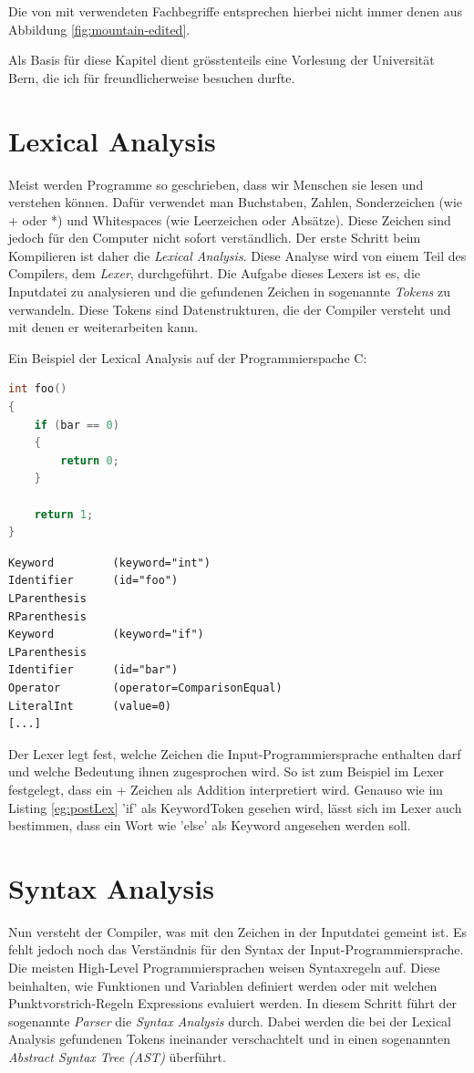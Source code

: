 Die von mit verwendeten Fachbegriffe entsprechen hierbei nicht immer denen aus Abbildung \ref{fig:mountain-edited}.

Als Basis für diese Kapitel dient grösstenteils eine Vorlesung der Universität Bern, die ich für freundlicherweise besuchen durfte.

\section{Lexical Analysis}
Meist werden Programme so geschrieben, dass wir Menschen sie lesen und verstehen können. Dafür verwendet man Buchstaben, Zahlen, Sonderzeichen (wie + oder *) und Whitespaces (wie Leerzeichen oder Absätze).
Diese Zeichen sind jedoch für den Computer nicht sofort verständlich. Der erste Schritt beim Kompilieren ist daher die \textit{Lexical Analysis}. Diese Analyse wird von einem Teil des Compilers, dem \textit{Lexer}, durchgeführt.
Die Aufgabe dieses Lexers ist es, die Inputdatei zu analysieren und die gefundenen Zeichen in sogenannte \textit{Tokens} zu verwandeln. Diese Tokens sind Datenstrukturen, die der Compiler versteht und mit denen er weiterarbeiten kann.

Ein Beispiel der Lexical Analysis auf der Programmierspache C:

\begin{lstlisting}[language=C, label=eg:preLex, caption=C code vor Lexical Analysis]
int foo()
{
    if (bar == 0)
    {
        return 0;
    }

    return 1;
}
\end{lstlisting}

\begin{lstlisting}[label=eg:postLex, caption=Tokens nach Lexical Analysis]
Keyword         (keyword="int")
Identifier      (id="foo")
LParenthesis
RParenthesis
Keyword         (keyword="if")
LParenthesis
Identifier      (id="bar")
Operator        (operator=ComparisonEqual)
LiteralInt      (value=0)
[...]
\end{lstlisting}

Der Lexer legt fest, welche Zeichen die Input-Programmiersprache enthalten darf und welche Bedeutung ihnen zugesprochen wird. So ist zum Beispiel im Lexer festgelegt, dass ein + Zeichen als Addition interpretiert wird.
Genauso wie im Listing \ref{eg:postLex} 'if' als KeywordToken gesehen wird, lässt sich im Lexer auch bestimmen, dass ein Wort wie 'else' als Keyword angesehen werden soll.

\section{Syntax Analysis}
Nun versteht der Compiler, was mit den Zeichen in der Inputdatei gemeint ist. Es fehlt jedoch noch das Verständnis für den Syntax der Input-Programmiersprache.
Die meisten High-Level Programmiersprachen weisen Syntaxregeln auf. Diese beinhalten, wie Funktionen und Variablen definiert werden oder mit welchen Punktvorstrich-Regeln Expressions evaluiert werden.
In diesem Schritt führt der sogenannte \textit{Parser} die \textit{Syntax Analysis} durch.
Dabei werden die bei der Lexical Analysis gefundenen Tokens ineinander verschachtelt und in einen sogenannten \textit{Abstract Syntax Tree (AST)} überführt.

